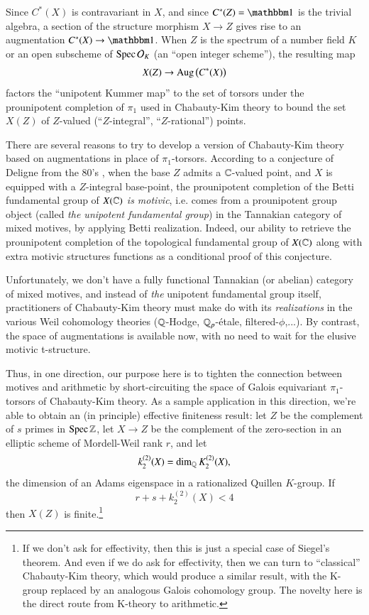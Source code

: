 Since $C^*(X)$ is contravariant in $X$, and since $C^*(Z) = \one$ is the trivial algebra, a section of the structure morphism $X \to Z$ gives rise to an augmentation $C^*(X) \to \one$. When $Z$ is the spectrum of a number field $K$ or an open subscheme of $\operatorname{Spec} \mathcal{O}_K$ (an ``open integer scheme''), the resulting map
\[
X(Z) \to \operatorname{Aug}\big(C^*(X)\big)
\]
factors the ``unipotent Kummer map'' to the set of torsors under the prounipotent completion of $\pi_1$ used in Chabauty-Kim theory to bound the set $X(Z)$ of $Z$-valued (``$Z$-integral'', ``$Z$-rational'') points. 

There are several reasons to try to develop a version of Chabauty-Kim theory based on augmentations in place of $\pi_1$-torsors. According to a conjecture of Deligne from the 80's \cite{Deligne89}, when the base $Z$ admits a $\mathbb{C}$-valued point, and $X$ is equipped with a $Z$-integral base-point, the prounipotent completion of the Betti fundamental group of $X(\mathbb{C})$ \textit{is motivic}, i.e. comes from a prounipotent group object (called \emph{the unipotent fundamental group}) in the Tannakian category of mixed motives, by applying Betti realization. Indeed, our ability to retrieve the prounipotent completion of the topological fundamental group of $X(\mathbb{C})$ along with extra motivic structures functions as a conditional proof of this conjecture. 

Unfortunately, we don't have a fully functional Tannakian (or abelian) category of mixed motives, and instead of \emph{the} unipotent fundamental group itself, practitioners of Chabauty-Kim theory must make do with its \emph{realizations} in the various Weil cohomology theories ($\mathbb{Q}$-Hodge, ${\mathbb{Q}_p}$-\'etale, filtered-$\phi$,...). By contrast, the space of augmentations is available now, with no need to wait for the elusive motivic t-structure. 

Thus, in one direction, our purpose here is to tighten the connection between motives and arithmetic by short-circuiting the space of Galois equivariant $\pi_1$-torsors of Chabauty-Kim theory. As a sample application in this direction, we're able to obtain an (in principle) effective finiteness result: let $Z$ be the complement of $s$ primes in $\operatorname{Spec} \mathbb{Z}$, let $X \to Z$ be the complement of the zero-section in an elliptic scheme of Mordell-Weil rank $r$, and let
\[
k^{(2)}_2(X) = \dim_{\mathbb{Q}} K^{(2)}_2(X),
\]
the dimension of an Adams eigenspace in a rationalized Quillen $K$-group. If 
\[
r+s+k^{(2)}_2(X) < 4
\]
then $X(Z)$ is finite.\footnote{If we don't ask for effectivity, then this is just a special case of Siegel's theorem. And even if we do ask for effectivity, then we can turn to ``classical'' Chabauty-Kim theory, which would produce a similar result, with the K-group replaced by an analogous Galois cohomology group. The novelty here is the direct route from K-theory to arithmetic.}

